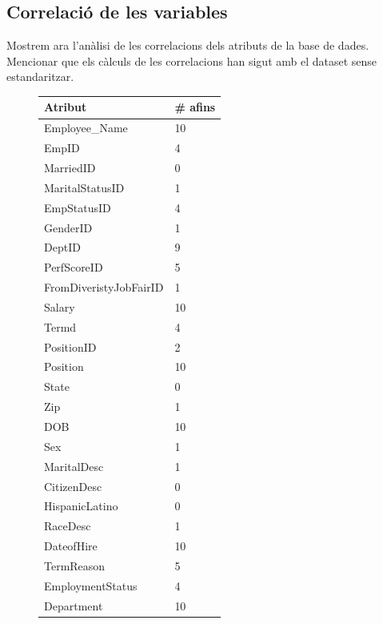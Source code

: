 \documentclass[a4paper, 11pt]{article}
\begin{document}
\subsection{Correlació de les variables} \label{correlacio}
Mostrem ara l'anàlisi de les correlacions dels atributs de la base de dades.\\ 
Mencionar que els càlculs de les correlacions han sigut amb el dataset sense estandaritzar.
\begin{figure}[h] %
\begin{minipage}{8cm} %
\begin{center}
    \begin{tabular}{l|l}
        \textbf{Atribut} & \textbf{\# afins}\\\hline\hline
        Employee\_Name & 10 \\\hline
        EmpID &  4 \\\hline
        MarriedID & 0 \\\hline
        MaritalStatusID & 1 \\\hline
        EmpStatusID & 4 \\\hline
        GenderID & 1  \\\hline
        DeptID & 9  \\\hline
        PerfScoreID & 5   \\\hline
        FromDiveristyJobFairID & 1 \\\hline
        Salary & 10   \\\hline
        Termd & 4\\\hline
        PositionID & 2 \\\hline
        Position & 10 \\\hline
        State &  0 \\\hline
        Zip & 1 \\\hline
        DOB & 10 \\\hline
        Sex & 1 \\\hline
        MaritalDesc & 1\\\hline
        CitizenDesc & 0 \\\hline
        HispanicLatino & 0 \\\hline
        RaceDesc & 1 \\\hline
        DateofHire & 10 \\\hline
        TermReason & 5 \\\hline
        EmploymentStatus & 4 \\\hline
        Department & 10 \\\hline

\end{tabular}
\end{center}
\end{minipage}
\end{figure}
\end{document}
